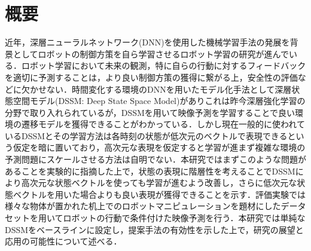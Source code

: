 \chapter*{概要}
\label{chap:abstract}

近年，深層ニューラルネットワーク(DNN)を使用した機械学習手法の発展を背景としてロボットの制御方策を自ら学習させるロボット学習の研究が進んでいる．ロボット学習において未来の観測，特に自らの行動に対するフィードバックを適切に予測することは，より良い制御方策の獲得に繋がる上，安全性の評価などに欠かせない．時間変化する環境のDNNを用いたモデル化手法として深層状態空間モデル(DSSM: Deep State Space Model)がありこれは昨今深層強化学習の分野で取り入れられているが，DSSMを用いて映像予測を学習することで良い環境の遷移モデルを獲得できることがわかっている．しかし現在一般的に使われているDSSMとその学習方法は各時刻の状態が低次元のベクトルで表現できるという仮定を暗に置いており，高次元な表現を仮定すると学習が進まず複雑な環境の予測問題にスケールさせる方法は自明でない．本研究ではまずこのような問題があることを実験的に指摘した上で，状態の表現に階層性を考えることでDSSMにより高次元な状態ベクトルを使っても学習が進むよう改善し，さらに低次元な状態ベクトルを用いた場合よりも良い表現が獲得できることを示す．評価実験では様々な物体が置かれた机上でのロボットマニピュレーションを題材にしたデータセットを用いてロボットの行動で条件付けた映像予測を行う．本研究では単純なDSSMをベースラインに設定し，提案手法の有効性を示した上で，研究の展望と応用の可能性について述べる．




